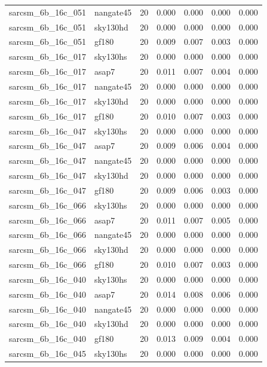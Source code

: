 \begin{tabular}{llrrrrr}
sarcsm\_6b\_16c\_051 & nangate45 & 20 & 0.000 & 0.000 & 0.000 & 0.000 \\
sarcsm\_6b\_16c\_051 & sky130hd & 20 & 0.000 & 0.000 & 0.000 & 0.000 \\
sarcsm\_6b\_16c\_051 & gf180 & 20 & 0.009 & 0.007 & 0.003 & 0.000 \\
sarcsm\_6b\_16c\_017 & sky130hs & 20 & 0.000 & 0.000 & 0.000 & 0.000 \\
sarcsm\_6b\_16c\_017 & asap7 & 20 & 0.011 & 0.007 & 0.004 & 0.000 \\
sarcsm\_6b\_16c\_017 & nangate45 & 20 & 0.000 & 0.000 & 0.000 & 0.000 \\
sarcsm\_6b\_16c\_017 & sky130hd & 20 & 0.000 & 0.000 & 0.000 & 0.000 \\
sarcsm\_6b\_16c\_017 & gf180 & 20 & 0.010 & 0.007 & 0.003 & 0.000 \\
sarcsm\_6b\_16c\_047 & sky130hs & 20 & 0.000 & 0.000 & 0.000 & 0.000 \\
sarcsm\_6b\_16c\_047 & asap7 & 20 & 0.009 & 0.006 & 0.004 & 0.000 \\
sarcsm\_6b\_16c\_047 & nangate45 & 20 & 0.000 & 0.000 & 0.000 & 0.000 \\
sarcsm\_6b\_16c\_047 & sky130hd & 20 & 0.000 & 0.000 & 0.000 & 0.000 \\
sarcsm\_6b\_16c\_047 & gf180 & 20 & 0.009 & 0.006 & 0.003 & 0.000 \\
sarcsm\_6b\_16c\_066 & sky130hs & 20 & 0.000 & 0.000 & 0.000 & 0.000 \\
sarcsm\_6b\_16c\_066 & asap7 & 20 & 0.011 & 0.007 & 0.005 & 0.000 \\
sarcsm\_6b\_16c\_066 & nangate45 & 20 & 0.000 & 0.000 & 0.000 & 0.000 \\
sarcsm\_6b\_16c\_066 & sky130hd & 20 & 0.000 & 0.000 & 0.000 & 0.000 \\
sarcsm\_6b\_16c\_066 & gf180 & 20 & 0.010 & 0.007 & 0.003 & 0.000 \\
sarcsm\_6b\_16c\_040 & sky130hs & 20 & 0.000 & 0.000 & 0.000 & 0.000 \\
sarcsm\_6b\_16c\_040 & asap7 & 20 & 0.014 & 0.008 & 0.006 & 0.000 \\
sarcsm\_6b\_16c\_040 & nangate45 & 20 & 0.000 & 0.000 & 0.000 & 0.000 \\
sarcsm\_6b\_16c\_040 & sky130hd & 20 & 0.000 & 0.000 & 0.000 & 0.000 \\
sarcsm\_6b\_16c\_040 & gf180 & 20 & 0.013 & 0.009 & 0.004 & 0.000 \\
sarcsm\_6b\_16c\_045 & sky130hs & 20 & 0.000 & 0.000 & 0.000 & 0.000 \\

\end{tabular}
